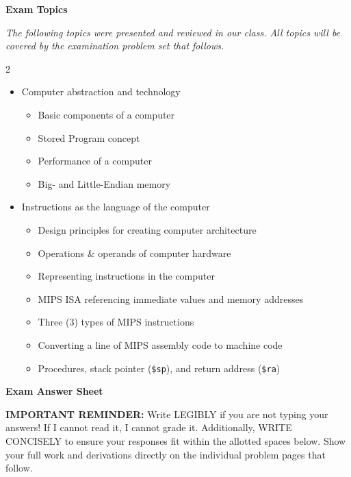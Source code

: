 \documentclass[letterpaper]{report}
\begin{document}
\pagestyle{empty}
\begin{center}
{\bf Exam Topics}
\end{center}
\vspace{0.5pc}
{\it The following topics were presented and reviewed in our class.  All topics will be covered by the examination problem set that follows.}
\vspace{0.5pc}
\begin{center}
\begin{multicols}{2}
\begin{itemize}
	\item Computer abstraction and technology
		\begin{itemize}
			\item Basic components of a computer
                \item Stored Program concept
			\item Performance of a computer
			\item Big- and Little-Endian memory
		\end{itemize}
	\item Instructions as the language of the computer
		\begin{itemize}
                \item Design principles for creating computer architecture
			\item Operations \& operands of computer hardware
			\item Representing instructions in the computer
			\item MIPS ISA referencing immediate values and memory addresses
                \item Three (3) types of MIPS instructions
			\item Converting a line of MIPS assembly code to machine code
                \item Procedures, stack pointer (\texttt{\$sp}), and return address (\texttt{\$ra})
		\end{itemize}
\end{itemize}
\end{multicols}
\end{center}

\newpage
\pagestyle{myheadings}

\begin{center}
{\LARGE \bf Exam Answer Sheet}
\end{center}
\vspace{0.2in}
\textbf{IMPORTANT REMINDER:} Write LEGIBLY if you are not typing your answers! If I cannot read it, I cannot grade it. Additionally, WRITE CONCISELY to ensure your responses fit within the allotted spaces below. Show your full work and derivations directly on the individual problem pages that follow.
\vspace{0.2in}
\end{document}
